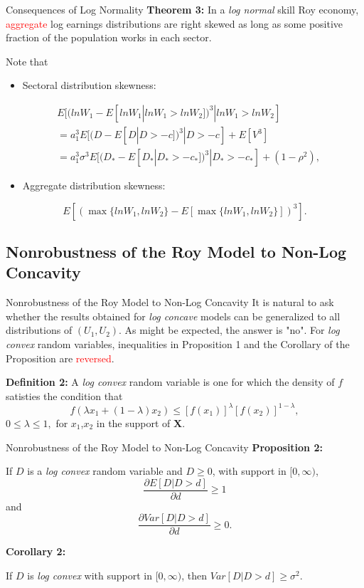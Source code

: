 \documentclass{beamer}
\begin{document}
\begin{frame}{Consequences of Log Normality}
	\textbf{Theorem 3:} In a \textit{log normal} skill Roy economy, \textcolor{red}{aggregate} log earnings distributions are right skewed as long as some positive fraction of the population works in each sector.

	\bigskip
	Note that
	\begin{itemize}
		\item Sectoral distribution skewness:
	\end{itemize}
	\begin{equation}\nonumber
		\begin{aligned}
		&E[(lnW_1-E[lnW_1|lnW_1>lnW_2])^3|lnW_1>lnW_2] \\
		&=a^3_1E[(D-E[D|D>-c])^3|D>-c]+E[V^3] \\
		&=a^3_1\sigma^3E[(D_*-E[D_*|D_*>-c_*])^3|D_*>-c_*]+(1-\rho^2),
		\end{aligned}
	\end{equation}
	\begin{itemize}
		\item Aggregate distribution skewness:
	\end{itemize}
	$$E[(\max \{lnW_1,lnW_2\}-E[\max \{lnW_1,lnW_2\}])^3].$$

\end{frame}

\subsection{Nonrobustness of the Roy Model to Non-Log Concavity}
\begin{frame}{Nonrobustness of the Roy Model to Non-Log Concavity}
It is natural to ask whether the results obtained for \textit{log concave} models can be generalized to all distributions of $(U_1,U_2)$. As might be expected, the answer is "no". For \textit{log convex} random variables, inequalities in Proposition 1 and the Corollary of the Proposition are \textcolor{red}{reversed}.

\bigskip
\pause
\textbf{Definition 2:} A \textit{log convex} random variable is one for which the density of $f$ satisties the condition that 
	$$f(\lambda x_1+(1-\lambda)x_2)\leq [f(x_1)]^\lambda[f(x_2)]^{1-\lambda},$$
	$0\leq\lambda\leq1,$ for $x_1$,$x_2$ in the support of $\mathbf{X}$.
\end{frame}

\begin{frame}{Nonrobustness of the Roy Model to Non-Log Concavity}
	\textbf{Proposition 2:}
	
	If $D$ is a \textit{log convex} random variable and $D\geq 0$, with support in $[0,\infty)$,
	$$\frac{\partial E[D|D>d]}{\partial d}\geq 1$$
	and
	$$\frac{\partial Var[D|D>d]}{\partial d}\geq 0. $$

\bigskip
\pause
\textbf{Corollary 2:}

If $D$ is \textit{log convex} with support in $[0,\infty)$, then $Var[D|D>d]\geq \sigma^2$.
\end{frame}
\end{document}
